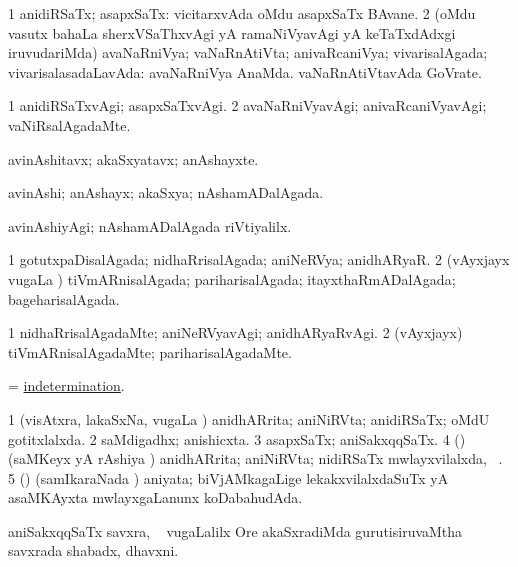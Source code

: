 \bentry
{}
\gl{\gu}
\bmng
\bnum
\num{1} anidiRSaTx; asapxSaTx:  vicitarxvAda oMdu asapxSaTx BAvane. 
\num{2} (oMdu vasutx bahaLa sherxVSaThxvAgi yA ramaNiVyavAgi yA keTaTxdAdxgi iruvudariMda) avaNaRniVya; vaNaRnAtiVta; anivaRcaniVya; vivarisalAgada; vivarisalasadaLavAda:  avaNaRniVya AnaMda.  vaNaRnAtiVtavAda GoVrate. 
\enum
\emng
\eentry

\bentry
{}
\gl{\kirxvi}
\bmng
\bnum
\num{1} anidiRSaTxvAgi; asapxSaTxvAgi. 
\num{2} avaNaRniVyavAgi; anivaRcaniVyavAgi; vaNiRsalAgadaMte. 
\enum
\emng
\eentry

\bentry
{}
\gl{\nA}
\bmng
avinAshitavx; akaSxyatavx; anAshayxte. 
\emng
\eentry

\bentry
{}
\gl{\gu}
\bmng
avinAshi; anAshayx; akaSxya; nAshamADalAgada. 
\emng
\eentry

\bentry
{}
\gl{\kirxvi}
\bmng
avinAshiyAgi; nAshamADalAgada riVtiyalilx. 
\emng
\eentry

\bentry
{}
\gl{\gu}
\bmng
\bnum
\num{1} gotutxpaDisalAgada; nidhaRrisalAgada; aniNeRVya; anidhARyaR. 
\num{2} (vAyxjayx \mo vugaLa \vi) tiVmARnisalAgada; pariharisalAgada; itayxthaRmADalAgada; bageharisalAgada. 
\enum
\emng
\eentry

\bentry
{}
\gl{\kirxvi}
\bmng
\bnum
\num{1} nidhaRrisalAgadaMte; aniNeRVyavAgi; anidhARyaRvAgi. 
\num{2} (vAyxjayx) tiVmARnisalAgadaMte; pariharisalAgadaMte. 
\enum
\emng
\eentry

\bentry
{}
\gl{\nA}
\bmng
 = \hyperlink{indetermination}{indetermination}. 
\emng
\eentry

\bentry
{}
\gl{\gu}
\bmng
\bnum
\num{1} (visAtxra, lakaSxNa, \mo vugaLa \vi) anidhARrita; aniNiRVta; anidiRSaTx; oMdU gotitxlalxda. 
\num{2} saMdigadhx; anishicxta. 
\num{3} asapxSaTx; aniSakxqqSaTx. 
\num{4} (\ga) (saMKeyx yA rAshiya \vi) anidhARrita; aniNiRVta; nidiRSaTx mwlayxvilalxda, \udA\ \eng{$\frac\bg 0\eg\bg 0\eg$}. 
\num{5} (\ga) (samIkaraNada \vi) aniyata; biVjAMkagaLige lekakxvilalxdaSuTx yA asaMKAyxta mwlayxgaLanunx koDabahudAda. 
\enum
\emng

\noindent
\gl{\pagu}
\bmng
{} 
 aniSakxqqSaTx savxra, \udA\  \mo vugaLalilx Ore akaSxradiMda gurutisiruvaMtha savxrada shabadx, dhavxni. 
\emng
\eentry

